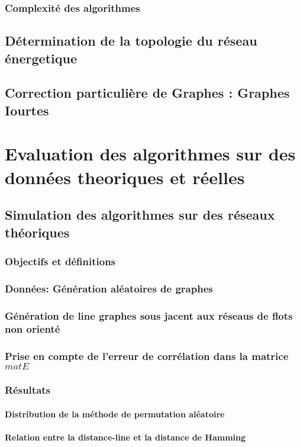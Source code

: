 \documentclass[onecolumn, 12pt]{book}
\begin{document}
		\subsection{Complexit\'e des algorithmes}
	\section{D\'etermination de la topologie du r\'eseau \'energetique}
	\section{Correction particuli\`ere de Graphes : Graphes Iourtes }

\chapter{Evaluation des algorithmes sur des donn\'ees theoriques et r\'eelles}
	\section{Simulation des algorithmes sur des r\'eseaux th\'eoriques}
		\subsection{Objectifs et d\'efinitions}
		\subsection{Donn\'ees: G\'en\'eration al\'eatoires de graphes}
		\subsection{G\'en\'eration de line graphes sous jacent aux r\'eseaus de flots non orient\'e}
		\subsection{Prise en compte de l'erreur de corr\'elation dans la matrice $matE$}
		\subsection{R\'esultats}
			\subsubsection{Distribution de la m\'ethode de permutation al\'eatoire}
			\subsubsection{Relation entre la distance-line et la distance de Hamming}
\end{document}
